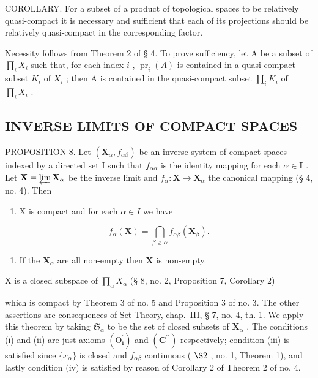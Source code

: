COROLLARY. For a subset of a product of topological spaces to be relatively quasi-compact it is necessary and sufficient that each of its projections should be relatively quasi-compact in the corresponding factor.

Necessity follows from Theorem 2 of § 4. To prove sufficiency, let A be a subset of \(\prod_{i} X_{i}\) such that, for each index \(i\) , \(\operatorname{pr}_{i}(A)\) is contained in a quasi-compact subset \(K_{i}\) of \(X_{i}\) ; then A is contained in the quasi-compact subset \(\prod_{i} K_{i}\) of \(\prod_{i} X_{i}\) .

\subsection{INVERSE LIMITS OF COMPACT SPACES}

PROPOSITION 8. Let \((\mathbf{X}_{\alpha}, f_{\alpha \beta})\) be an inverse system of compact spaces indexed by a directed set I such that \(f_{\alpha \alpha}\) is the identity mapping for each \(\alpha \in \mathbf{I}\) . Let \(\mathbf{X} = \varprojlim \mathbf{X}_{\alpha}\) be the inverse limit and \(f_{\alpha}: \mathbf{X} \to \mathbf{X}_{\alpha}\) the canonical mapping (§ 4, no. 4). Then

\begin{enumerate}
\def\labelenumi{\alph{enumi})}
\tightlist
\item
  X is compact and for each \(\alpha \in I\) we have
\end{enumerate}

\[
f _ {\alpha} (\mathbf {X}) = \bigcap_ {\beta \geqslant \alpha} f _ {\alpha \beta} (\mathbf {X} _ {\beta}).\tag{I}
\]

\begin{enumerate}
\def\labelenumi{\alph{enumi})}
\setcounter{enumi}{1}
\tightlist
\item
  If the \(\mathbf{X}_{\alpha}\) are all non-empty then \(\mathbf{X}\) is non-empty.
\end{enumerate}

X is a closed subspace of \(\prod_{\alpha} X_{\alpha}\) (§ 8, no. 2, Proposition 7, Corollary 2)

which is compact by Theorem 3 of no. 5 and Proposition 3 of no. 3. The other assertions are consequences of Set Theory, chap.~III, § 7, no. 4, th. 1. We apply this theorem by taking \(\mathfrak{S}_{\alpha}\) to be the set of closed subsets of \(\mathbf{X}_{\alpha}\) . The conditions (i) and (ii) are just axioms \((\mathrm{O}_{\mathbf{i}}^{\prime})\) and \((\mathbf{C}^{\prime \prime})\) respectively; condition (iii) is satisfied since \(\{x_{\alpha}\}\) is closed and \(f_{\alpha \beta}\) continuous ( \(\S 2\) , no. 1, Theorem 1), and lastly condition (iv) is satisfied by reason of Corollary 2 of Theorem 2 of no. 4.

